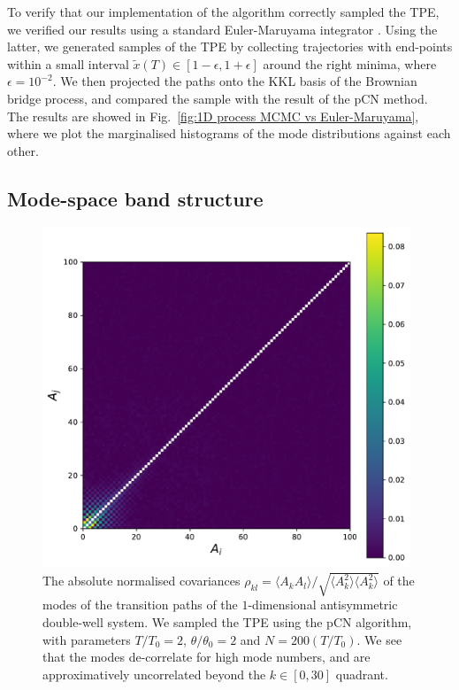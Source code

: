 To verify that our implementation of the algorithm correctly sampled the TPE, we verified our results using a standard Euler-Maruyama integrator \citep{kloedenNumericalSolutionStochastic2011}. Using the latter, we generated samples of the TPE by collecting trajectories
with end-points within a small interval $\tilde{x}(T)\in[1-\epsilon,1+\epsilon]$
around the right minima, where $\epsilon=10^{-2}$. We then projected the paths onto the KKL basis of the Brownian bridge process, and compared the sample with the result of the pCN method. The results are showed in Fig.~\ref{fig:1D process MCMC vs Euler-Maruyama}, where we plot the marginalised histograms of the mode distributions against each other.

\subsection{Mode-space band structure} \label{sec:Mode-space band structure}

\begin{figure}[t]
\includegraphics[width=0.98\textwidth]{figs_part1/mcmc/1D_process_covariances}
\centering \caption{The absolute normalised covariances $\rho_{kl} = \langle A_k A_l \rangle / \sqrt{ \langle A_k^2 \rangle \langle A_k^2 \rangle }$ of the modes of the transition paths of the $1$-dimensional antisymmetric double-well system. We sampled the TPE using the pCN algorithm, with parameters $T/T_0 = 2$, $\theta/\theta_0 = 2$ and $N = 200(T/T_0)$. We see that the modes de-correlate for high mode numbers, and are approximatively uncorrelated beyond the $k \in [0, 30]$ quadrant.}
\label{fig:1D process covariance} 
\end{figure}

